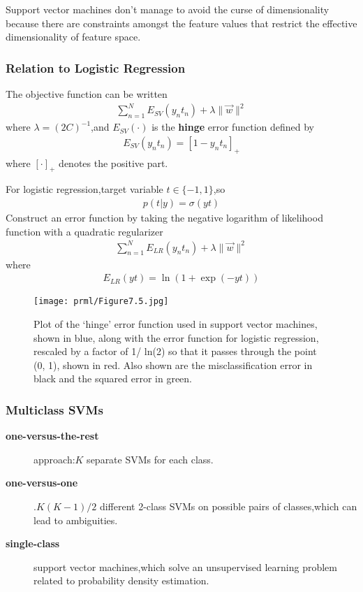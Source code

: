 Support vector machines don't manage to avoid the curse of dimensionality because there are constraints amongst the feature values that restrict the effective dimensionality of feature space.

\subsubsection{Relation to Logistic Regression}
The objective function can be written 
\begin{align}
\sum_{n=1}^{N}E_{SV}(y_n t_n) +\lambda\parallel\vec{w}\parallel^2
\end{align}
where $\lambda=(2C)^{-1}$,and $E_{SV}(\cdot)$ is the \textbf{hinge} error function defined by
\begin{align}
E_{SV}(y_n t_n)= [1-y_n t_n]_{+}
\end{align}
where $[\cdot]_+$ denotes the positive part.

For logistic regression,target variable $t\in \{-1,1\}$,so
\begin{align}
p(t|y)=\sigma(yt)
\end{align}
Construct an error function by taking the negative logarithm of likelihood function with a quadratic regularizer
\begin{align}
\sum_{n=1}^{N}E_{LR}(y_n t_n)+\lambda\parallel\vec{w}\parallel^2
\end{align}
where
\begin{align}
E_{LR}(yt)=\ln(1+\exp(-yt))
\end{align}
\begin{SCfigure*}
	\caption{Plot of the ‘hinge’ error function used in support vector machines, shown in blue, along with the error function for logistic regression, rescaled by a factor of 1/ ln(2) so that it passes through the point (0, 1), shown in red. Also shown are the misclassification error in black and the squared error in green.}
	\texttt{[image: prml/Figure7.5.jpg]}
\end{SCfigure*}

\subsubsection{Multiclass SVMs}
\begin{description}
	\item[\textbf{one-versus-the-rest}] approach:$K$ separate SVMs for each class.
	\item[\textbf{one-versus-one}].$K(K-1)/2$ different 2-class SVMs on possible pairs of classes,which can lead to ambiguities.
	\item[\textbf{single-class}] support vector machines,which solve an unsupervised learning problem related to probability density estimation.
\end{description}

